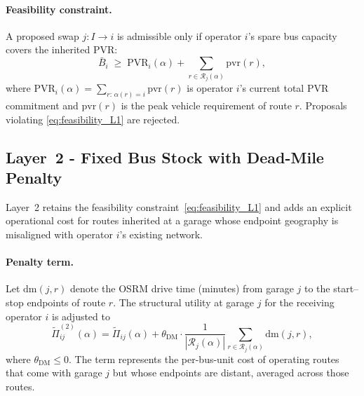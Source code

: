 \documentclass[12pt]{article}
\begin{document}
\paragraph{Feasibility constraint.}
A proposed swap $j: I \to i$ is admissible only if operator $i$'s spare
bus capacity covers the inherited PVR:
\begin{equation}
  \bar{B}_i \;\geq\; \text{PVR}_i(\alpha) + \sum_{r \in \mathcal{R}_j(\alpha)} \text{pvr}(r),
  \label{eq:feasibility_L1}
\end{equation}
where $\text{PVR}_i(\alpha) = \sum_{r:\,\alpha(r)=i} \text{pvr}(r)$ is
operator $i$'s current total PVR commitment and $\text{pvr}(r)$ is the
peak vehicle requirement of route $r$.  Proposals violating
\eqref{eq:feasibility_L1} are rejected.

\subsection{Layer~2 - Fixed Bus Stock with Dead-Mile Penalty}

Layer~2 retains the feasibility constraint~\eqref{eq:feasibility_L1} and
adds an explicit operational cost for routes inherited at a garage whose
endpoint geography is misaligned with operator $i$'s existing network.

\paragraph{Penalty term.}
Let $\text{dm}(j, r)$ denote the OSRM drive time (minutes) from garage
$j$ to the start--stop endpoints of route $r$.  The structural utility at
garage $j$ for the receiving operator $i$ is adjusted to
\begin{equation}
  \tilde{\Pi}^{(2)}_{ij}(\alpha)
    = \tilde{\Pi}_{ij}(\alpha)
    + \theta_{\text{DM}} \cdot
        \frac{1}{|\mathcal{R}_j(\alpha)|}
        \sum_{r \in \mathcal{R}_j(\alpha)} \text{dm}(j, r),
  \label{eq:pi_hat_L2}
\end{equation}
where $\theta_{\text{DM}} \leq 0$.  The term represents the per-bus-unit
cost of operating routes that come with garage $j$ but whose endpoints
are distant, averaged across those routes.
\end{document}
